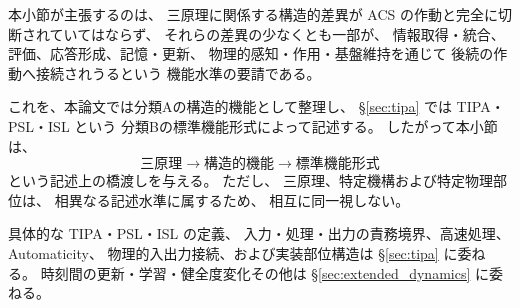 \begin{remark}[原理水準から機構水準への接続の最小的主張]
\label{rem:principles_to_mechanisms_scope}
本小節が主張するのは、
三原理に関係する構造的差異が
ACS の作動と完全に切断されていてはならず、
それらの差異の少なくとも一部が、
情報取得・統合、評価、応答形成、記憶・更新、
物理的感知・作用・基盤維持を通じて
後続の作動へ接続されうるという
機能水準の要請である。

これを、本論文では分類Aの構造的機能として整理し、
\S\ref{sec:tipa} では TIPA・PSL・ISL という
分類Bの標準機能形式によって記述する。
したがって本小節は、
\[
  \text{三原理}
  \longrightarrow
  \text{構造的機能}
  \longrightarrow
  \text{標準機能形式}
\]
という記述上の橋渡しを与える。
ただし、
三原理、特定機構および特定物理部位は、
相異なる記述水準に属するため、
相互に同一視しない。

具体的な TIPA・PSL・ISL の定義、
入力・処理・出力の責務境界、高速処理、Automaticity、
物理的入出力接続、および実装部位構造は
\S\ref{sec:tipa} に委ねる。
時刻間の更新・学習・健全度変化その他は
\S\ref{sec:extended_dynamics} に委ねる。
\end{remark}
